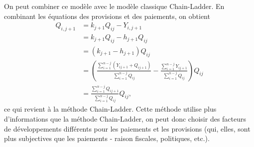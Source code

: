 On peut combiner ce modèle avec le modèle classique Chain-Ladder. En
combinant les équations des provisions et des paiements, on obtient
\begin{align*}
  Q_{i, j+1}
  &= k_{j+1} Q_{ij} - Y_{i, j+1}\\
  &= k_{j+1} Q_{ij} - h_{j+1}  Q_{ij} \\
  &= (k_{j+1} - h_{j+1}) Q_{ij} \\
  &= \left(\frac{\sum_{i=1}^{n-j} \left( Y_{i j+1} + Q_{i j+1} \right)}{\sum_{i=1}^{n-j} Q_{i j}}
    - \frac{\sum_{i=1}^{n-j} Y_{i j+1}}{\sum_{i=1}^{n-j} Q_{i j}} \right)  Q_{ij} \\
  &= \frac{\sum_{i=1}^{n-j} Q_{i j+1} }{\sum_{i=1}^{n-j} Q_{i j}}  Q_{ij},
\end{align*}
ce qui revient à la méthode Chain-Ladder. Cette méthode utilise plus
d'informations que la méthode Chain-Ladder, on peut donc choisir des
facteurs de développements différents pour les paiements et les
provisions (qui, elles, sont plus subjectives que les paiements - raison
fiscales, politiques, etc.).

